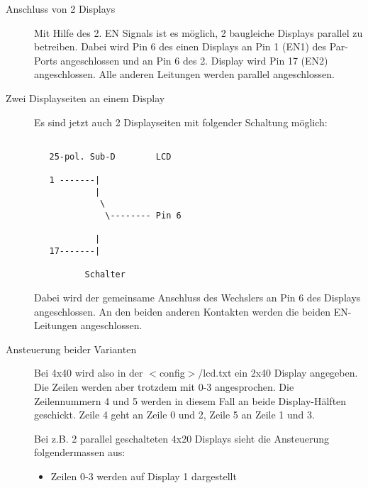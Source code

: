 \begin{description}
\item [Anschluss von 2 Displays]

   Mit Hilfe des 2. EN Signals ist es möglich, 2 baugleiche Displays
   parallel zu betreiben. Dabei wird Pin 6 des einen Displays an 
   Pin 1 (EN1) des Par-Ports angeschlossen und an Pin 6 des 2. Display
   wird Pin 17 (EN2) angeschlossen. Alle anderen Leitungen werden
   parallel angeschlossen.


 \item  [Zwei Displayseiten an einem Display]

   Es sind jetzt auch 2 Displayseiten mit folgender Schaltung möglich:
\begin{example}
\begin{verbatim}

   25-pol. Sub-D        LCD

   1 -------|
            |
             \
              \-------- Pin 6

            |
   17-------|

          Schalter
\end{verbatim}
\end{example}

   Dabei wird der gemeinsame Anschluss des Wechslers an Pin 6 des
   Displays angeschlossen. An den beiden anderen Kontakten werden
   die beiden EN-Leitungen angeschlossen.


 \item   [Ansteuerung beider Varianten]


  Bei 4x40 wird also in der $<$config$>$/lcd.txt ein 2x40 Display angegeben.
  Die Zeilen werden aber trotzdem mit 0-3 angesprochen.
  Die Zeilennummern 4 und 5 werden in diesem Fall an beide
  Display-Hälften geschickt. Zeile 4 geht an Zeile 0 und 2,
  Zeile 5 an Zeile 1 und 3.

  Bei z.B. 2 parallel geschalteten 4x20 Displays sieht die
  Ansteuerung folgendermassen aus:

  \begin{itemize}
  \item Zeilen 0-3 werden auf Display 1 dargestellt
    

\end{itemize}
\end{description}
